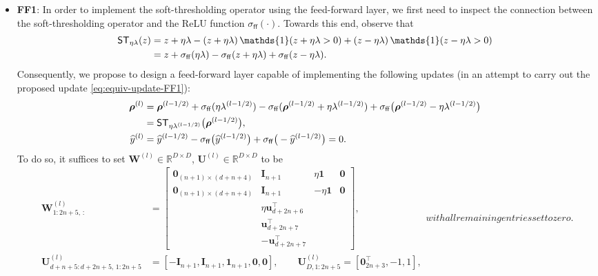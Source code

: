 \documentclass[english]{article}
\DeclareMathOperator{\ind}{\mathds{1}}  %
\begin{document}
\begin{itemize}
\item \textbf{FF1}: 
%
In order to implement the soft-thresholding operator using the feed-forward layer, we first need to inspect the connection between the soft-thresholding operator and the ReLU function $\sigma_{\mathsf{ff}}(\cdot)$. Towards this end, observe that 
%
\begin{align}
\mathsf{ST}_{\eta\lambda}(z) &= z +\eta\lambda - (z+\eta\lambda)\ind(z+\eta\lambda>0) +  (z-\eta\lambda)\ind(z-\eta\lambda>0) \notag\\
&=z +\sigma_{\mathsf{ff}}(\eta\lambda) - \sigma_{\mathsf{ff}}(z+\eta\lambda) +  \sigma_{\mathsf{ff}}(z-\eta\lambda).
\end{align}
%
Consequently, we propose to design a feed-forward layer capable of implementing the following updates (in an attempt to carry out the proposed update \eqref{eq:equiv-update-FF1}):    
%
\begin{align*}
{\bm \rho}^{(l)} &= {\bm \rho}^{(l-1/2)} +\sigma_{\mathsf{ff}}(\eta\lambda^{(l-1/2)})- \sigma_{\mathsf{ff}}({\bm \rho}^{(l-1/2)} + \eta\lambda^{(l-1/2)}) + \sigma_{\mathsf{ff}}\big({\bm \rho}^{(l-1/2)} - \eta\lambda^{(l-1/2)}\big) \notag\\
&= \mathsf{ST}_{\eta\lambda^{(l-1/2)}}\big({\bm \rho}^{(l-1/2)}\big),\notag\\
\widehat{y}^{(l)} &= \widehat{y}^{(l-1/2)} -\sigma_{\mathsf{ff}}\big(\widehat{y}^{(l-1/2)}\big) + \sigma_{\mathsf{ff}}\big(-\widehat{y}^{(l-1/2)}\big)= 0.
\end{align*}
%
To do so, it suffices to set ${\bm W}^{(l)}\in\mathbb{R}^{D\times D}$, ${\bm U}^{(l)}\in\mathbb{R}^{D\times D}$ to be
%
\begin{subequations}
\begin{align}
{\bm W}^{(l)}_{1:2n+5,\,:} &= \left[
\begin{array}{cccc}
{\bm 0}_{(n+1)\times (d+n+4)} &{\bm I}_{n+1} & \eta{\bm 1} &{\bm 0}\\
{\bm 0}_{(n+1)\times (d+n+4)}& {\bm I}_{n+1}& -\eta{\bm 1}& {\bm 0}\\
&    \eta{\bm u}_{d+2n+6}^{\top} && \\
 &    {\bm u}_{d+2n+7}^{\top} && \\
 &    -{\bm u}_{d+2n+7}^{\top} &&
\end{array}
\right],\\
{\bm U}_{d+n+5:d+2n+5,\,1:2n+5}^{(l)} &= [-{\bm I}_{n+1},{\bm I}_{n+1},{\bm 1}_{n+1},{\bm 0},{\bm 0}],\qquad 
{\bm U}_{D,1:2n+5}^{(l)} = [{\bm 0}_{2n+3}^{\top},-1,1],
\end{align}
with all remaining entries set to zero.
\end{subequations}


\end{itemize}
\end{document}
